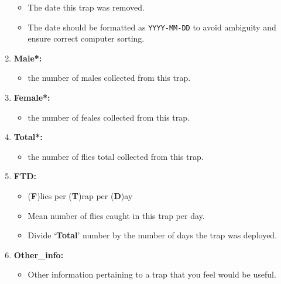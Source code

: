 \documentclass[letterpaper]{scrreprt}
\begin{document}
\begin{enumerate}
  \begin{itemize}
  \itemsep1pt\parskip0pt
  \item
    The date this trap was removed.
  \item
    The date should be formatted as \texttt{YYYY-MM-DD} to avoid
    ambiguity and ensure correct computer sorting.
  \end{itemize}
\item
  \textbf{Male*:}

  \begin{itemize}
  \itemsep1pt\parskip0pt
  \item
    the number of males collected from this trap.
  \end{itemize}
\item
  \textbf{Female*:}

  \begin{itemize}
  \itemsep1pt\parskip0pt
  \item
    the number of feales collected from this trap.
  \end{itemize}
\item
  \textbf{Total*:}

  \begin{itemize}
  \itemsep1pt\parskip0pt
  \item
    the number of flies total collected from this trap.
  \end{itemize}
\item
  \textbf{FTD:}

  \begin{itemize}
  \itemsep1pt\parskip0pt
  \item
    (\textbf{F})lies per (\textbf{T})rap per (\textbf{D})ay
  \item
    Mean number of flies caught in this trap per day.
  \item
    Divide `\textbf{Total}' number by the number of days the trap was
    deployed.
  \end{itemize}
\item
  \textbf{Other\_info:}

  \begin{itemize}
  \itemsep1pt\parskip0pt
  \item
    Other information pertaining to a trap that you feel would be
    useful.
  \end{itemize}
\end{enumerate}
\end{document}

